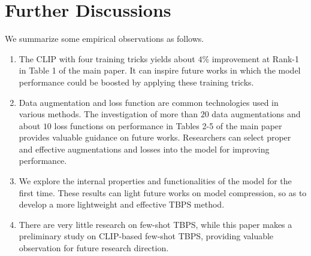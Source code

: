 \documentclass[letterpaper]{article} %
\begin{document}
\section{Further Discussions}

We summarize some empirical observations as follows.
\begin{enumerate}[label=\arabic*), ref=\arabic*]
\item The CLIP with four training tricks yields about $4\%$ improvement at Rank-1 in Table 1 of the main paper. It can inspire future works in which the model performance could be boosted by applying these training tricks.
\item Data augmentation and loss function are common technologies used in various methods. The investigation of more than $20$ data augmentations and about $10$ loss functions on performance in Tables 2-5 of the main paper provides valuable guidance on future works.
Researchers can select proper and effective augmentations and losses into the model for improving performance.
\item We explore the internal properties and functionalities of the model for the first time. These results can light future works on model compression, so as to develop a more lightweight and effective TBPS method.
\item There are very little research on few-shot TBPS, while this paper makes a preliminary study on CLIP-based few-shot TBPS, providing valuable observation for future research direction. 
\end{enumerate}
\end{document}
